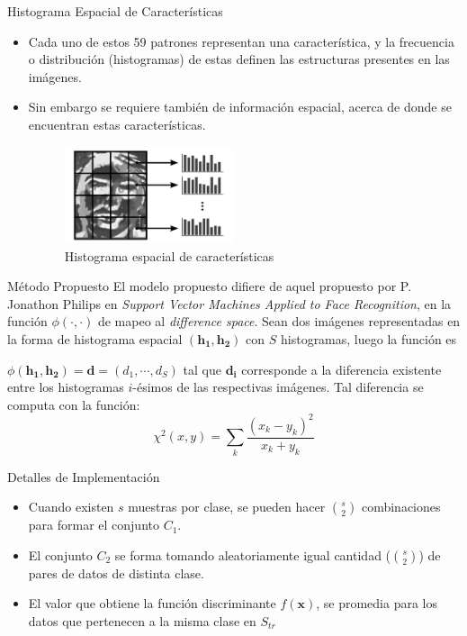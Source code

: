 \documentclass{beamer}
\begin{document}
\begin{frame}{Histograma Espacial de Características}
\begin{itemize}
    \item Cada uno de estos 59 patrones representan una característica, y la frecuencia o distribución (histogramas) de estas definen las estructuras presentes en las imágenes.
    \item Sin embargo se requiere también de información espacial, acerca de donde se encuentran estas características.
\begin{figure}[htpb!]
\centering
\includegraphics[width=5cm]{spatial_hist}
\caption{Histograma espacial de características}
\end{figure}
\end{itemize}
\end{frame}


\begin{frame}{Método Propuesto}
El modelo propuesto difiere de aquel propuesto por P. Jonathon Philips en \textit{Support Vector Machines Applied to Face Recognition}, en la función $\phi(\cdot,\cdot)$ de mapeo al \textit{difference space}. Sean dos imágenes representadas en la forma de histograma espacial $(\mathbf{h_1},\mathbf{h_2})$ con $S$ histogramas, luego la función es

\begin{definition}
    $\phi(\mathbf{h_1}, \mathbf{h_2}) = \mathbf{d} = (d_1, \cdots, d_S)$ tal que $\mathbf{d_i}$ corresponde a la diferencia existente entre los histogramas $i$-ésimos de las respectivas imágenes. Tal diferencia se computa con la función:
    $$\chi^2(x,y) = \sum_k \frac{(x_k - y_k)^2}{x_k + y_k}$$
\end{definition}
\end{frame}


\begin{frame}{Detalles de Implementación}
\begin{itemize}
    \item Cuando existen $s$ muestras por clase, se pueden hacer $\binom{s}{2}$ combinaciones para formar el conjunto $C_1$.
    \item El conjunto $C_2$ se forma tomando aleatoriamente igual cantidad ($\binom{s}{2}$) de pares de datos de distinta clase.
    \item El valor que obtiene la función discriminante $f(\mathbf{x})$, se promedia para los datos que pertenecen a la misma clase en $S_{tr}$
\end{itemize}
\end{frame}
\end{document}
